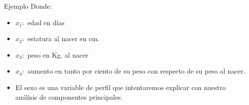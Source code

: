 \documentclass[
  spanish,
  ignorenonframetext,
]{beamer}
\providecommand{\tightlist}{%
  \setlength{\itemsep}{0pt}\setlength{\parskip}{0pt}}
\begin{document}
\begin{frame}{Ejemplo}
\protect\hypertarget{ejemplo-1}{}
Donde:

\begin{itemize}
\tightlist
\item
  \(x_1:\) edad en días
\item
  \(x_2:\) estatura al nacer en cm.
\item
  \(x_3:\) peso en Kg. al nacer
\item
  \(x_4:\) aumento en tanto por ciento de su peso con respecto de su
  peso al nacer.
\item
  El sexo es una variable de perfil que intentaremos explicar con
  nuestro análisis de componentes principales.
\end{itemize}
\end{frame}
\end{document}
